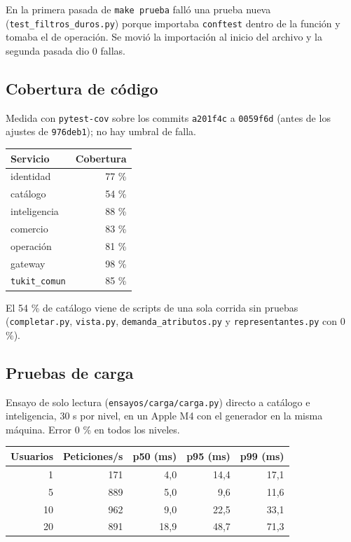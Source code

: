\documentclass[11pt,letterpaper]{article}
\newcommand{\ruta}[1]{\texttt{\small #1}}
\begin{document}
En la primera pasada de \ruta{make prueba} falló una prueba nueva (\ruta{test\_\allowbreak{}filtros\_\allowbreak{}duros.py}) porque importaba
\ruta{conftest} dentro de la función y tomaba el de operación. Se movió la importación al inicio del archivo y la
segunda pasada dio 0 fallas.

\subsection{Cobertura de código}

Medida con \ruta{pytest-cov} sobre los commits \ruta{a201f4c} a \ruta{0059f6d} (antes de los ajustes de \ruta{976deb1}); no hay umbral de falla.

\begin{table}[h]
\centering\small
\begin{tabular}{lr}
\toprule
Servicio & Cobertura \\
\midrule
identidad & 77 \% \\
catálogo & 54 \% \\
inteligencia & 88 \% \\
comercio & 83 \% \\
operación & 81 \% \\
gateway & 98 \% \\
\ruta{tukit\_comun} & 85 \% \\
\bottomrule
\end{tabular}
\end{table}

El 54 \% de catálogo viene de scripts de una sola corrida sin pruebas (\ruta{completar.py}, \ruta{vista.py},
\ruta{demanda\_\allowbreak{}atributos.py} y \ruta{representantes.py} con 0 \%).

\subsection{Pruebas de carga}

Ensayo de solo lectura (\ruta{ensayos/\allowbreak{}carga/\allowbreak{}carga.py}) directo a catálogo e inteligencia, 30 s por nivel, en un Apple M4
con el generador en la misma máquina. Error 0 \% en todos los niveles.

\begin{table}[h]
\centering\small
\begin{tabular}{rrrrr}
\toprule
Usuarios & Peticiones/s & p50 (ms) & p95 (ms) & p99 (ms) \\
\midrule
1 & 171 & 4,0 & 14,4 & 17,1 \\
5 & 889 & 5,0 & 9,6 & 11,6 \\
10 & 962 & 9,0 & 22,5 & 33,1 \\
20 & 891 & 18,9 & 48,7 & 71,3 \\
\bottomrule
\end{tabular}
\end{table}
\end{document}
